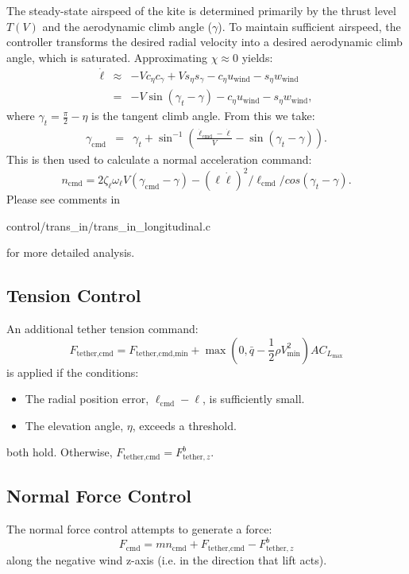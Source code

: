 \documentclass{article}
\newcommand{\uwind}{u_{\textrm{wind}}}
\newcommand{\wwind}{w_{\textrm{wind}}}
\newcommand{\gammacmd}{\gamma_{\textrm{cmd}}}
\newcommand{\ncmd}{n_{\textrm{cmd}}}
\newcommand{\radius}{\ell}
\newcommand{\dradius}{\dot \radius}
\newcommand{\radiuscmd}{\radius_\textrm{cmd}}
\newcommand{\dradiuscmd}{\dot \radius_\textrm{cmd}}
\newcommand{\omegaradius}{\omega_\radius}
\newcommand{\zetaradius}{\zeta_\radius}
\newcommand{\cgamma}{c_\gamma}
\newcommand{\ceta}{c_\eta}
\newcommand{\Fcmd}{F_\textrm{cmd}}
\newcommand{\Ftetherz}{F^b_{\textrm{tether},z}}
\newcommand{\tensioncmd}{F_\textrm{tether,cmd}}
\newcommand{\tensioncmdmin}{F_\textrm{tether,cmd,min}}
\newcommand{\sgamma}{s_\gamma}
\newcommand{\seta}{s_\eta}
\begin{document}
The steady-state airspeed of the kite is determined primarily by the
thrust level $T(V)$ and the aerodynamic climb angle ($\gamma$).  To
maintain sufficient airspeed, the controller transforms the desired
radial velocity into a desired aerodynamic climb angle, which is
saturated.  Approximating $\chi \approx 0$ yields:
\begin{eqnarray}
\dradius &\approx& -V \ceta \cgamma + V \seta \sgamma  - \ceta \uwind - \seta \wwind\\
&=& -V \sin(\gamma_t - \gamma) - \ceta \uwind - \seta \wwind,
\end{eqnarray}
where $\gamma_t = \frac{\pi}2 - \eta$ is the tangent climb angle.
From this we take:
\begin{eqnarray}
\gammacmd &=& \gamma_t + \sin^{-1}\left(\frac{\dradiuscmd - \dradius}V 
- \sin(\gamma_t - \gamma)\right).
\end{eqnarray}
This is then used to calculate a normal acceleration command:
\begin{equation}
\ncmd = 2 \zetaradius \omegaradius V (\gammacmd - \gamma) - (\ell \dradius)^2 / \radiuscmd / cos(\gamma_t - \gamma).
\end{equation}
Please see comments in \begin{tt}control/trans\_in/trans\_in\_longitudinal.c\end{tt}
for more detailed analysis.


\subsection{Tension Control}
An additional tether tension command:
\begin{equation}
\tensioncmd = \tensioncmdmin
+ \max\left (0, \bar q - \frac{1}2 \rho V_{\textrm{min}}^2\right) AC_{L_{\textrm{max}}}
\end{equation}
is applied if the conditions:
\begin{itemize}
\item The radial position error, $\radiuscmd - \radius$, is sufficiently small.
\item The elevation angle, $\eta$, exceeds a threshold.
\end{itemize}
both hold.  Otherwise, $\tensioncmd = \Ftetherz$.


\subsection{Normal Force Control}
The normal force control attempts to generate a force:
\begin{equation}
\Fcmd = m \ncmd + \tensioncmd - \Ftetherz
\end{equation}
along the negative wind z-axis (i.e. in the direction that lift acts).
\end{document}

